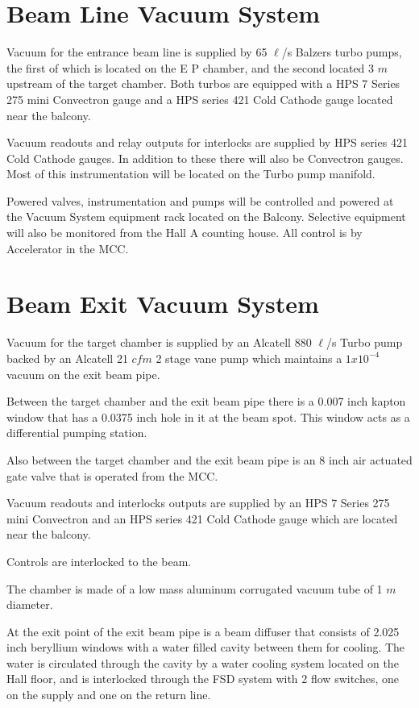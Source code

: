 \section{Beam Line Vacuum System}

Vacuum for the entrance beam line is supplied by 65 $\ell$/s Balzers turbo
pumps, the first of which is located on the E P chamber, and the
second located 3 $m$ upstream of the target chamber.  Both turbos
are equipped with a HPS 7 Series 275 mini Convectron gauge and a HPS
series 421 Cold Cathode gauge located near the balcony.

Vacuum readouts and relay outputs for interlocks are supplied by HPS series 421 
Cold Cathode gauges.  In addition to these there will also be Convectron 
gauges.  Most of this instrumentation will be located on the Turbo pump 
manifold.

Powered valves, instrumentation and pumps will be controlled and powered 
at the Vacuum System equipment rack located on the Balcony.  Selective 
equipment will also be monitored from the Hall A counting house.  All 
control is by Accelerator in the MCC.

\section{Beam Exit Vacuum System}

Vacuum for the target chamber is supplied by an Alcatell 880
$\ell$/s Turbo pump backed by an Alcatell 21 $cfm$ 2 stage vane pump
which maintains a $1x10^{-4}$ vacuum on the exit beam pipe.

Between the target chamber and the exit beam pipe there is a 0.007 inch
kapton window that has a 0.0375 inch hole in it at the beam spot.  This
window acts as a differential pumping station.

Also between the target chamber and the exit beam pipe is an 8 inch
air actuated gate valve that is operated from the MCC.

Vacuum readouts and interlocks outputs are supplied by an HPS 7 Series 
275 mini Convectron and an HPS series 421 Cold Cathode gauge
which are located near the balcony.

Controls are interlocked to the beam.

The chamber is made of a low mass aluminum corrugated vacuum tube of 1 
$m$ diameter.

At the exit point of the exit beam pipe is a beam diffuser that
consists of 2.025 inch beryllium windows with a water filled cavity between
them for cooling.  The water is circulated through the cavity by a
water cooling system located on the Hall floor, and is interlocked
through the FSD system with 2 flow switches, one on the supply and
one on the return line.


